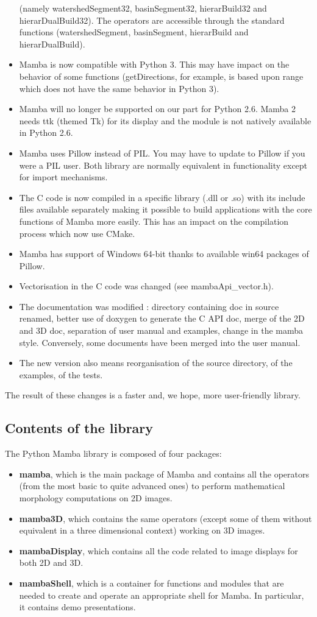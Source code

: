 \documentclass[a4paper,10pt,oneside]{article}
\begin{document}
\begin{itemize}
(namely watershedSegment32, basinSegment32, hierarBuild32 and hierarDualBuild32).
The operators are accessible through the standard functions (watershedSegment,
basinSegment, hierarBuild and hierarDualBuild).
\item Mamba is now compatible with Python 3. This may have impact on the
behavior of some functions (getDirections, for example, is based upon range
which does not have the same behavior in Python 3).
\item Mamba will no longer be supported on our part for Python 2.6. Mamba 2
needs ttk (themed Tk) for its display and the module is not natively available
in Python 2.6.
\item Mamba uses Pillow instead of PIL. You may have to update to Pillow if
you were a PIL user. Both library are normally equivalent in functionality
except for import mechanisms.
\item The C code is now compiled in a specific library (.dll or .so) with
its include files available separately making it possible to build applications
with the core functions of Mamba more easily. This has an impact on the
compilation process which now use CMake.
\item Mamba has support of Windows 64-bit thanks to available win64 packages
of Pillow.
\item Vectorisation in the C code was changed (see mambaApi\_vector.h).
\item The documentation was modified : directory containing doc in source renamed,
better use of doxygen to generate the C API doc, merge of the 2D and 3D doc,
separation of user manual and examples, change in the mamba style. Conversely,
some documents have been merged into the user manual.
\item The new version also means reorganisation of the source directory, of the
examples, of the tests.
\end{itemize}

The result of these changes is a faster and, we hope, more user-friendly
library.

\subsection{Contents of the library}

The Python Mamba library is composed of four packages:
\begin{itemize}
\item \textbf{mamba}, which is the main package of Mamba and contains all the operators
(from the most basic to quite advanced ones) to perform mathematical morphology
computations on 2D images.
\item  \textbf{mamba3D}, which contains the same operators (except some of them without
equivalent in a three dimensional context) working on 3D images.
\item  \textbf{mambaDisplay}, which contains all the code related to image displays for
both 2D and 3D.
\item  \textbf{mambaShell}, which is a container for functions and modules that are
needed to create and operate an appropriate shell for Mamba. In particular, it
contains demo presentations.
\end{itemize}
\end{document}

